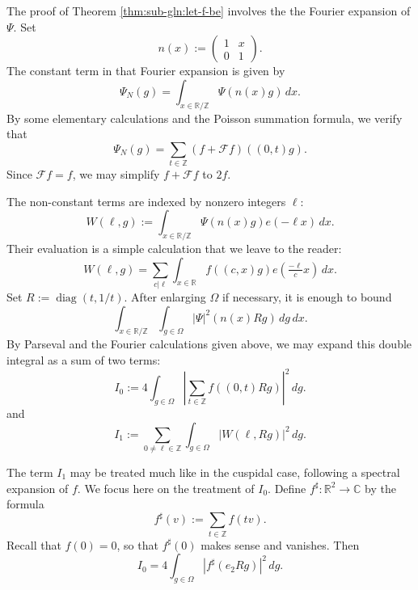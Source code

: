\documentclass[reqno]{amsart}
\DeclareMathOperator{\diag}{diag}
\theoremstyle{plain} \newtheorem{theorem} {Theorem}
\theoremstyle{definition} \newtheorem{definition} [theorem] {Definition}
\theoremstyle{itplain} %
\numberwithin{equation}{section}
\numberwithin{theorem}{section}
\begin{document}
The proof of Theorem \ref{thm:sub-gln:let-f-be} involves the the Fourier expansion of $\Psi$.  Set
\begin{equation*}
  n(x) := \begin{pmatrix}
    1 & x \\
    0 & 1
  \end{pmatrix}.
\end{equation*}
The constant term in that Fourier expansion is given by
\begin{equation*}
  \Psi_N(g) = \int _{x \in \mathbb{R} / \mathbb{Z} } \Psi(n(x) g) \, d x.
\end{equation*}
By some elementary calculations and the Poisson summation formula, we verify that
\begin{equation*}
  \Psi_N(g) = \sum _{t \in \mathbb{Z} } (f + \mathcal{F} f ) ((0,t) g).
\end{equation*}
Since $\mathcal{F}f = f$, we may simplify $f + \mathcal{F} f$ to $2 f$.

The non-constant terms are indexed by nonzero integers $\ell$:
\begin{equation*}
  W(\ell,g) := \int _{x \in \mathbb{R} / \mathbb{Z} } \Psi(n(x) g) e(-\ell x) \, d x.
\end{equation*}
Their evaluation is a simple calculation that we leave to the reader:
\begin{equation}\label{eq:well-g-=}
  W(\ell, g)
  = \sum _{c | \ell} \int _{x \in \mathbb{R} } f((c, x) g) e( \tfrac{- \ell}{c} x) \, d x.
\end{equation}
Set $R := \diag(t,1/t)$.  After enlarging $\Omega$ if necessary, it is enough to bound
\begin{equation*}
  \int _{x \in  \mathbb{R} / \mathbb{Z} }
  \int _{g \in \Omega }
  |\Psi|^2(n(x) R g) \, d g \, d x.
\end{equation*}
By Parseval and the Fourier calculations given above, we may expand this double integral as a sum of two terms:
\begin{equation*}
  I_0 := 4 \int _{g \in \Omega } \left\lvert \sum _{t \in \mathbb{Z} } f((0,t) R g) \right\rvert^2 \, d g.
\end{equation*}
and
\begin{equation*}
  I_1 := \sum _{0 \neq \ell \in \mathbb{Z}}
  \int _{g \in \Omega }
  |W(\ell, R g)|^2 \, d g.
\end{equation*}

The term $I_1$ may be treated much like in the cuspidal case, following a spectral expansion of $f$.  We focus here on the treatment of $I_0$.  Define $f^\sharp : \mathbb{R}^2 \rightarrow \mathbb{C}$ by the formula
\begin{equation*}
  f^\sharp(v)  := \sum _{t \in \mathbb{Z} } f(t v).
\end{equation*}
Recall that $f(0) = 0$, so that $f ^\sharp (0)$ makes sense and vanishes.  Then
\begin{equation*}
  I_0 = 4 \int _{g \in \Omega } | f^\sharp(e_2 R g)|^2 \, d g.
\end{equation*}
\end{document}
